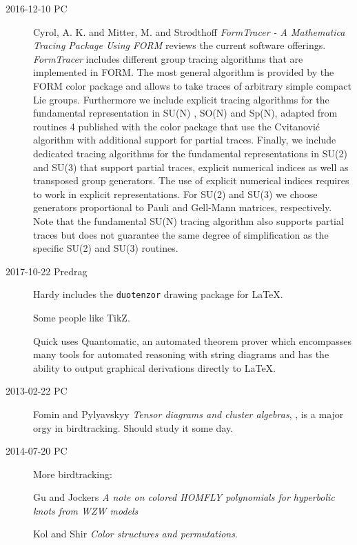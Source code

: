 \begin{description}
\item[2016-12-10 PC]
Cyrol, A. K. and Mitter, M. and Strodthoff
{\em {FormTracer - A Mathematica Tracing Package Using FORM}}
reviews the current software offerings.
\emph{FormTracer} includes different group tracing algorithms that are
implemented in FORM. The most general algorithm is
provided by the FORM color package and allows to take traces of
arbitrary simple compact Lie groups. Furthermore we include explicit tracing
algorithms for the fundamental representation in SU(N) , SO(N) and Sp(N),
adapted from routines 4 published with the color package that
use the Cvitanovi\'c algorithm with additional support for partial
traces. Finally, we include dedicated tracing algorithms for the fundamental
representations in SU(2) and SU(3) that support partial traces, explicit
numerical indices as well as transposed group generators. The use of explicit
numerical indices requires to work in explicit representations.  For SU(2)
and SU(3) we choose generators proportional to Pauli and Gell-Mann matrices,
respectively. Note that the fundamental SU(N) tracing algorithm also supports
partial traces but does not guarantee the same degree of simplification as
the specific SU(2) and SU(3) routines.

\item[2017-10-22 Predrag]
Hardy  includes the \texttt{duotenzor} drawing package for LaTeX.

Some people like
 {TikZ}.

Quick  uses 
{Quantomatic}, an automated theorem prover which  encompasses many tools for
automated reasoning with string diagrams and has the ability to output
graphical derivations directly to LaTeX.

\item[2013-02-22 PC] Fomin and Pylyavskyy
{\em Tensor diagrams and cluster algebras}, {},
is a major orgy in birdtracking. Should study it some day.

\item[2014-07-20 PC] More birdtracking:

Gu and Jockers
 {\em A note on colored {HOMFLY} polynomials for hyperbolic knots
      from {WZW} models}

Kol and Shir {\em Color structures and permutations}.


\end{description}

